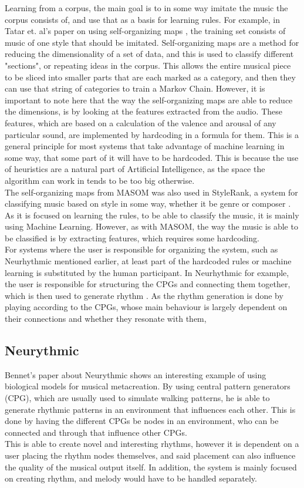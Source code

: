 \documentclass[a4paper,english]{report}
\begin{document}
	Learning from a corpus, the main goal is to in some way imitate the music the corpus consists of, and use that as a basis for learning rules. For example, in Tatar et. al's paper on using self-organizing maps \cite{tatar2017masom}, the training set consists of music of one style that should be imitated. Self-organizing maps are a method for reducing the dimensionality of a set of data, and this is used to classify different "sections", or repeating ideas in the corpus. This allows the entire musical piece to be sliced into smaller parts that are each marked as a category, and then they can use that string of categories to train a Markov Chain. However, it is important to note here that the way the self-organizing maps are able to reduce the dimensions, is by looking at the features extracted from the audio. These features, which are based on a calculation of the valence and arousal of any particular sound, are implemented by hardcoding in a formula for them. This is a general principle for most systems that take advantage of machine learning in some way, that some part of it will have to be hardcoded. This is because the use of heuristics are a natural part of Artificial Intelligence, as the space the algorithm can work in tends to be too big otherwise.\\
	The self-organizing maps from MASOM was also used in StyleRank, a system for classifying music based on style in some way, whether it be genre or composer \cite{ens2020quantifying}. As it is focused on learning the rules, to be able to classify the music, it is mainly using Machine Learning. However, as with MASOM, the way the music is able to be classified is by extracting features, which requires some hardcoding.\\
	For systems where the user is responsible for organizing the system, such as Neurhythmic mentioned earlier, at least part of the hardcoded rules or machine learning is substituted by the human participant. In Neurhythmic for example, the user is responsible for structuring the CPGs and connecting them together, which is then used to generate rhythm \cite{bennett2018neurythmic}. As the rhythm generation is done by playing according to the CPGs, whose main behaviour is largely dependent on their connections and whether they resonate with them, 
	\iffalse
	\subsection{Neurythmic}
	Bennet's paper about Neurythmic shows an interesting example of using biological models for musical metacreation. By using central pattern generators (CPG), which are usually used to simulate walking patterns, he is able to generate rhythmic patterns in an environment that influences each other. This is done by having the different CPGs be  nodes in an environment, who can be connected and through that influence other CPGs.\\
	This is able to create novel and interesting rhythms, however it is dependent on a user placing the rhythm nodes themselves, and said placement can also influence the quality of the musical output itself. In addition, the system is mainly focused on creating rhythm, and melody would have to be handled separately.
	
\end{document}
